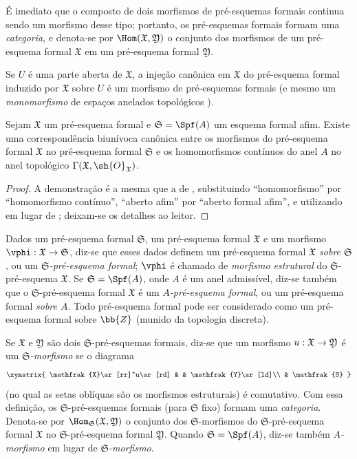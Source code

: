 \documentclass[oneside]{amsart}
\makeatletter
\newcommand{\ega@arrow}[2]{\mathchoice{#1}{#2}{#2}{#2}}
\renewcommand{\to}{\ega@arrow{\longrightarrow}{\rightarrow}}
\newcommand{\oldpage}[2][]{{\marginnote{\normalfont\textbf{#1}~|~#2}}\ignorespaces}
\let\EGAOriginalLabel\label
\renewcommand{\label}[1]{\phantomsection\EGAOriginalLabel{#1}}
\makeatother
\begin{document}
É imediato que o composto de dois morfismos de pré-esquemas formais continua sendo um morfismo desse tipo; portanto, os pré-esquemas formais formam uma \emph{categoria}, e denota-se por $\Hom(\mathfrak{X},\mathfrak{Y})$ o conjunto dos morfismos de um pré-esquema formal $\mathfrak{X}$ em um pré-esquema formal $\mathfrak{Y}$.

\oldpage[I]{186}
Se $U$ é uma parte aberta de $\mathfrak{X}$, a injeção canônica em $\mathfrak{X}$ do pré-esquema formal induzido por $\mathfrak{X}$ sobre $U$ é um morfismo de pré-esquemas formais (e mesmo um \emph{monomorfismo} de espaços anelados topológicos ).

\begin{proposition}[10.4.6]
\label{I.10.4.6}
Sejam $\mathfrak{X}$ um pré-esquema formal e $\mathfrak{S}=\Spf(A)$ um esquema formal afim.
Existe uma correspondência biunívoca canônica entre os morfismos do pré-esquema formal $\mathfrak{X}$ no pré-esquema formal $\mathfrak{S}$ e os homomorfismos contínuos do anel $A$ no anel topológico $\Gamma(\mathfrak{X},\sh{O}_\mathfrak{X})$.
\end{proposition}

\begin{proof}
A demonstração é a mesma que a de , substituindo ``homomorfismo'' por ``homomorfismo contínuo'', ``aberto afim'' por ``aberto formal afim'', e utilizando  em lugar de ; deixam-se os detalhes ao leitor.
\end{proof}

\begin{env}[10.4.7]
\label{I.10.4.7}
Dados um pré-esquema formal $\mathfrak{S}$, um pré-esquema formal $\mathfrak{X}$ e um morfismo $\vphi:\mathfrak{X}\to\mathfrak{S}$, diz-se que esses dados definem um pré-esquema formal \emph{$\mathfrak{X}$ sobre $\mathfrak{S}$}, ou um \emph{$\mathfrak{S}$-pré-esquema formal}; $\vphi$ é chamado de \emph{morfismo estrutural} do $\mathfrak{S}$-pré-esquema $\mathfrak{X}$.
Se $\mathfrak{S}=\Spf(A)$, onde $A$ é um anel admissível, diz-se também que o $\mathfrak{S}$-pré-esquema formal $\mathfrak{X}$ é um \emph{$A$-pré-esquema formal}, ou um pré-esquema formal \emph{sobre $A$}.
Todo pré-esquema formal pode ser considerado como um pré-esquema formal sobre $\bb{Z}$ (munido da topologia discreta).

Se $\mathfrak{X}$ e $\mathfrak{Y}$ são dois $\mathfrak{S}$-pré-esquemas formais, diz-se que um morfismo $u:\mathfrak{X}\to\mathfrak{Y}$ é um \emph{$\mathfrak{S}$-morfismo} se o diagrama
\[
  \xymatrix{
    \mathfrak{X}\ar[rr]^u\ar[rd] & &
    \mathfrak{Y}\ar[ld]\\
    & \mathfrak{S}
  }
\]
(no qual as setas oblíquas são os morfismos estruturais) é comutativo.
Com essa definição, os $\mathfrak{S}$-pré-esquemas formais (para $\mathfrak{S}$ fixo) formam uma \emph{categoria}.
Denota-se por $\Hom_\mathfrak{S}(\mathfrak{X},\mathfrak{Y})$ o conjunto dos $\mathfrak{S}$-morfismos do $\mathfrak{S}$-pré-esquema formal $\mathfrak{X}$ no $\mathfrak{S}$-pré-esquema formal $\mathfrak{Y}$.
Quando $\mathfrak{S}=\Spf(A)$, diz-se também \emph{$A$-morfismo} em lugar de \emph{$\mathfrak{S}$-morfismo}.
\end{env}
\end{document}
